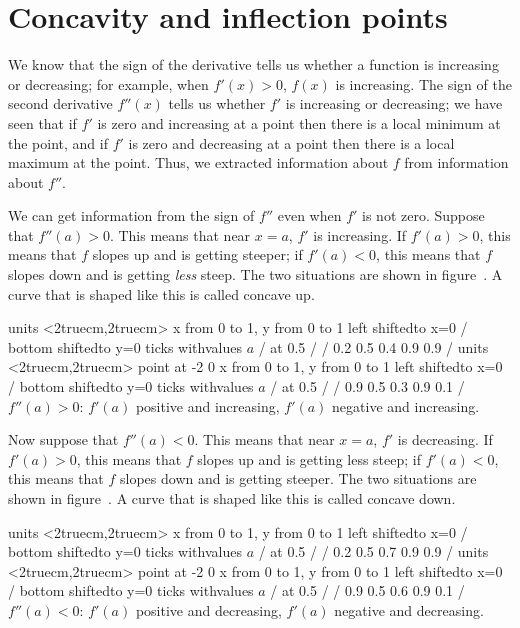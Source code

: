 \section{Concavity and inflection points} {}{}
\nobreak
We know that the sign of the derivative tells us whether a function is
increasing or decreasing; for example, when $f'(x)>0$,
$f(x)$ is increasing. The sign of the second derivative
$f''(x)$ tells us whether $f'$ is increasing or decreasing; we have
seen that if $f'$ is zero and increasing at a point then there is a
local minimum at the point, and if $f'$ is zero and decreasing at a
point then there is a local maximum at the point. Thus, we extracted
information about $f$ from information about $f''$. 

We can get information from the sign of $f''$ even when $f'$ is not
zero. Suppose that $f''(a)>0$. This means that near $x=a$, $f'$ is
increasing. If $f'(a)>0$, this means that $f$ slopes up and is getting
steeper; if $f'(a)<0$, this means that $f$ slopes down and is getting
{\it less\/} steep. The two situations are shown in
figure~. A curve that is shaped like this is
called {\dfont concave up.}


\figure
\texonly
\vbox{\beginpicture
\normalgraphs
\ninepoint
\setcoordinatesystem units <2truecm,2truecm>
\setplotarea x from 0 to 1, y from 0 to 1
\axis left shiftedto x=0 /
\axis bottom shiftedto y=0 ticks withvalues {$a$} / at 0.5 / /
\setquadratic
{} 0.2 0.5 0.4 0.9 0.9 /
\setcoordinatesystem units <2truecm,2truecm> point at -2 0
\setplotarea x from 0 to 1, y from 0 to 1
\axis left shiftedto x=0 /
\axis bottom shiftedto y=0 ticks withvalues {$a$} / at 0.5 / /
\setquadratic
{} 0.9 0.5 0.3 0.9 0.1 /
\endpicture}
\endtexonly
{}
\begincaption
$f''(a)>0$: $f'(a)$ positive and increasing, $f'(a)$ negative and increasing.
\endcaption
\endfigure

Now suppose that $f''(a)<0$. This means that near $x=a$, $f'$ is
decreasing. If $f'(a)>0$, this means that $f$ slopes up and is getting
less steep; if $f'(a)<0$, this means that $f$ slopes down and is getting
steeper. The two situations are shown in
figure~. A curve that is shaped like this is
called {\dfont concave down.}


\figure
\texonly
\vbox{\beginpicture
\normalgraphs
\ninepoint
\setcoordinatesystem units <2truecm,2truecm>
\setplotarea x from 0 to 1, y from 0 to 1
\axis left shiftedto x=0 /
\axis bottom shiftedto y=0 ticks withvalues {$a$} / at 0.5 / /
\setquadratic
{} 0.2 0.5 0.7 0.9 0.9 /
\setcoordinatesystem units <2truecm,2truecm> point at -2 0
\setplotarea x from 0 to 1, y from 0 to 1
\axis left shiftedto x=0 /
\axis bottom shiftedto y=0 ticks withvalues {$a$} / at 0.5 / /
\setquadratic
{} 0.9 0.5 0.6 0.9 0.1 /
\endpicture}
\endtexonly
{}
\begincaption
$f''(a)<0$: $f'(a)$ positive and decreasing, $f'(a)$ negative and decreasing.
\endcaption
\endfigure

